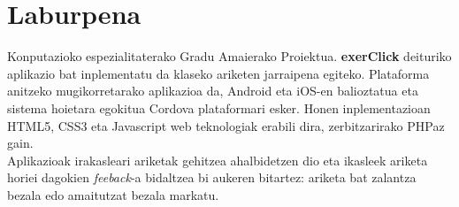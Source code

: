 \section*{Laburpena}

Konputazioko espezialitaterako Gradu Amaierako Proiektua. \textbf{exerClick} deituriko aplikazio bat inplementatu da klaseko ariketen jarraipena egiteko. Plataforma anitzeko mugikorretarako aplikazioa da, Android eta iOS-en balioztatua eta sistema hoietara egokitua Cordova \cite{apachecordova} plataformari esker. Honen inplementazioan HTML5, CSS3 eta Javascript web teknologiak erabili dira, zerbitzarirako PHPaz gain.\\

Aplikazioak irakasleari ariketak gehitzea ahalbidetzen dio eta ikasleek ariketa horiei dagokien \textit{feeback}-a bidaltzea bi aukeren bitartez: ariketa bat zalantza bezala edo amaitutzat bezala markatu.\\